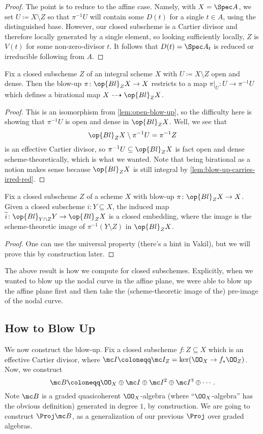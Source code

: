 \documentclass[../notes.tex]{subfiles}
\begin{document}
\begin{proof}
	The point is to reduce to the affine case. Namely, with $X=\Spec A$, we set $U\coloneqq X\setminus Z$ so that $\pi^{-1}U$ will contain some $D(t)$ for a single $t\in A$, using the distinguished base. However, our closed subscheme is a Cartier divisor and therefore locally generated by a single element, so looking sufficiently locally, $Z$ is $V(t)$ for some non-zero-divisor $t$. It follows that $D(t)=\Spec A_t$ is reduced or irreducible following from $A$.
\end{proof}
\begin{lemma}
	Fix a closed subscheme $Z$ of an integral scheme $X$ with $U\coloneqq X\setminus Z$ open and dense. Then the blow-up $\pi\colon\op{Bl}_ZX\to X$ restricts to a map $\pi|_U\colon U\to\pi^{-1}U$ which defines a birational map $X\dashrightarrow\op{Bl}_ZX$.
\end{lemma}
\begin{proof}
	This is an isomorphism from \autoref{lem:open-blow-up}, so the difficulty here is showing that $\pi^{-1}U$ is open and dense in $\op{Bl}_ZX$. Well, we see that
	\[\op{Bl}_ZX\setminus\pi^{-1}U=\pi^{-1}Z\]
	is an effective Cartier divisor, so $\pi^{-1}U\subseteq\op{Bl}_ZX$ is fact open and dense scheme-theoretically, which is what we wanted. Note that being birational as a notion makes sense because $\op{Bl}_ZX$ is still integral by \autoref{lem:blow-up-carries-irred-red}.
\end{proof}
\begin{lemma}
	Fix a closed subscheme $Z$ of a scheme $X$ with blow-up $\pi\colon\op{Bl}_ZX\to X$. Given a closed subscheme $i\colon Y\subseteq X$, the induced map $\widetilde i\colon\op{Bl}_{Y\cap Z}Y\to\op{Bl}_ZX$ is a closed embedding, where the image is the scheme-theoretic image of $\pi^{-1}(Y\setminus Z)$ in $\op{Bl}_ZX$.
\end{lemma}
\begin{proof}
	One can use the universal property (there's a hint in Vakil), but we will prove this by construction later.
\end{proof}
\begin{remark}
	The above result is how we compute for closed subschemes. Explicitly, when we wanted to blow up the nodal curve in the affine plane, we were able to blow up the affine plane first and then take the (scheme-theoretic image of the) pre-image of the nodal curve.
\end{remark}

\subsection{How to Blow Up}
We now construct the blow-up. Fix a closed subscheme $f\colon Z\subseteq X$ which is an effective Cartier divisor, where $\mc I\coloneqq\mc I_Z=\ker(\OO_X\to f_*\OO_Z)$. Now, we construct
\[\mc B\coloneqq\OO_X\oplus\mc I\oplus\mc I^2\oplus\mc I^3\oplus\cdots.\]
Note $\mc B$ is a graded quasicoherent $\OO_X$-algebra (where ``$\OO_X$-algebra'' has the obvious definition) generated in degree $1$, by construction. We are going to construct $\Proj\mc B$, as a generalization of our previous $\Proj$ over graded algebras.
\end{document}
